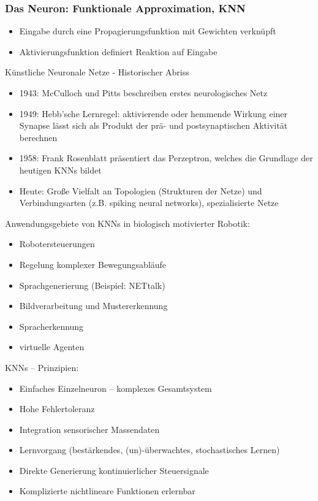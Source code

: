 \subsubsection{Das Neuron: Funktionale Approximation, KNN}
\begin{itemize}
\item Eingabe durch eine Propagierungsfunktion mit Gewichten verknüpft
\item Aktivierungsfunktion definiert Reaktion auf Eingabe
\end{itemize}
Künstliche Neuronale Netze - Historischer Abriss
\begin{itemize}
\item 1943: McCulloch und Pitts beschreiben erstes neurologisches Netz
\item 1949: Hebb'sche Lernregel: aktivierende oder hemmende Wirkung einer Synapse lässt sich als Produkt der prä-
und postsynaptischen Aktivität berechnen
\item 1958: Frank Rosenblatt präsentiert das Perzeptron, welches die Grundlage der heutigen KNNs bildet
\item Heute: Große Vielfalt an Topologien (Strukturen der Netze) und Verbindungsarten (z.B. \glqq spiking neural networks\grqq), spezialisierte Netze
\end{itemize}
Anwendungsgebiete von KNNs in biologisch motivierter Robotik:
\begin{itemize}
\item Robotersteuerungen
\item Regelung komplexer Bewegungsabläufe
\item Sprachgenerierung (Beispiel: NETtalk)
\item Bildverarbeitung und Mustererkennung
\item Spracherkennung
\item virtuelle Agenten
\end{itemize}
KNNs -- Prinzipien:
\begin{itemize}
\item Einfaches Einzelneuron – komplexes Gesamtsystem
\item Hohe Fehlertoleranz
\item Integration sensorischer Massendaten
\item Lernvorgang (bestärkendes, (un)-überwachtes, stochastisches Lernen)
\item Direkte Generierung kontinuierlicher Steuersignale
\item Komplizierte nichtlineare Funktionen erlernbar
\end{itemize}
